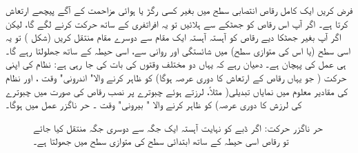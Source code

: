 
 
فرض کریں ایک کامل   رقاص   انتصابی سطح  میں بغیر کسی رگڑ یا ہوائی مزاحمت کے آگے پیچھے ارتعاش کرتا ہے۔ اگر آپ اس   رقاص   کو  جھٹکے سے ہلائیں تو یہ افراتفری کے ساتھ  حرکت کرنے لگے گا،  لیکن اگر آپ بغیر جھٹکا دیے    رقاص   کو آہستہ آہستہ ایک مقام سے دوسرے  مقام منتقل کریں (شکل )    تو   یہ    اسی سطح  (یا اس کی  متوازی سطح)  میں شائستگی اور روانی سے،  اسی حیطہ کے ساتھ جھلولتا رہے گا۔  ہی  عمل کی پہچان ہے۔ دھیان رہے کہ یہاں دو مختلف   وقتوں کی بات کی جا رہی ہے:  نظام کی اپنی  حرکت (  جو یہاں   رقاص   کے  ارتعاش کا دوری عرصہ ہوگا)   کو ظاہر کرنے والا" اندرونی"  وقت ،  اور نظام  کی مقادیر معلوم میں  نمایاں تبدیلی( مثلاً،  لرزتے ہوئے چبوترے  پر نصب   رقاص   کی صورت میں چبوترے کی لرزش کا دوری عرصہ)  کو ظاہر کرنے والا " بیرونی"  وقت ۔ حر ناگزر عمل میں  ہوگا۔

\begin{figure}
\centering
{}
\caption{حر ناگزر حرکت: اگر ڈبے کو نہایت آہستہ ایک جگہ سے دوسری جگہ منتقل کیا جائے تو   رقاص   اسی حیطہ کے ساتھ ابتدائی سطح کی متوازی سطح میں جھولتا ہے۔}
\label{شکل_حرارت_نا_گزر_آہستہ_منتقلی}
\end{figure}


